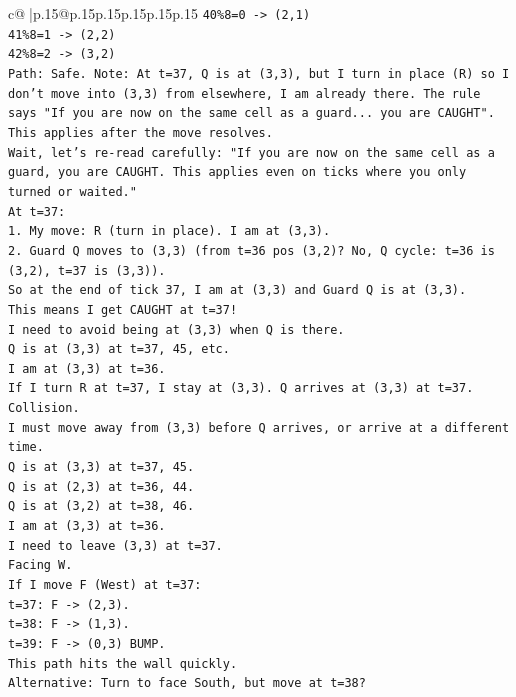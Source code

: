 \documentclass{article}
\begin{document}
{\begin{supertabular}{c@{$\;$}|p{.15\linewidth}@{}p{.15\linewidth}p{.15\linewidth}p{.15\linewidth}p{.15\linewidth}p{.15\linewidth}}
{{{\texttt{40\%8=0 {-}> (2,1)} \\
\texttt{41\%8=1 {-}> (2,2)} \\
\texttt{42\%8=2 {-}> (3,2)} \\
\texttt{Path: Safe. Note: At t=37, Q is at (3,3), but I turn in place (R) so I don't move into (3,3) from elsewhere, I am already there. The rule says "If you are now on the same cell as a guard... you are CAUGHT". This applies after the move resolves.} \\
\texttt{Wait, let's re{-}read carefully: "If you are now on the same cell as a guard, you are CAUGHT. This applies even on ticks where you only turned or waited."} \\
\texttt{At t=37:} \\
\texttt{1. My move: R (turn in place). I am at (3,3).} \\
\texttt{2. Guard Q moves to (3,3) (from t=36 pos (3,2)? No, Q cycle: t=36 is (3,2), t=37 is (3,3)).} \\
\texttt{So at the end of tick 37, I am at (3,3) and Guard Q is at (3,3).} \\
\texttt{This means I get CAUGHT at t=37!} \\
\texttt{I need to avoid being at (3,3) when Q is there.} \\
\texttt{Q is at (3,3) at t=37, 45, etc.} \\
\texttt{I am at (3,3) at t=36.} \\
\texttt{If I turn R at t=37, I stay at (3,3). Q arrives at (3,3) at t=37. Collision.} \\
\texttt{I must move away from (3,3) before Q arrives, or arrive at a different time.} \\
\texttt{Q is at (3,3) at t=37, 45.} \\
\texttt{Q is at (2,3) at t=36, 44.} \\
\texttt{Q is at (3,2) at t=38, 46.} \\
\texttt{I am at (3,3) at t=36.} \\
\texttt{I need to leave (3,3) at t=37.} \\
\texttt{Facing W.} \\
\texttt{If I move F (West) at t=37:} \\
\texttt{t=37: F {-}> (2,3).} \\
\texttt{t=38: F {-}> (1,3).} \\
\texttt{t=39: F {-}> (0,3) BUMP.} \\
\texttt{This path hits the wall quickly.} \\
\texttt{Alternative: Turn to face South, but move at t=38?} \\
}}}
\end{supertabular}}
\end{document}
